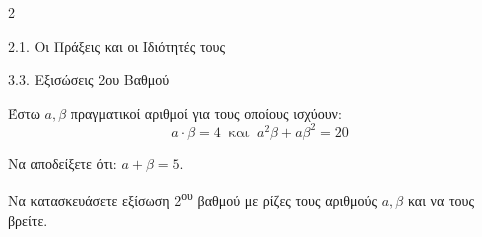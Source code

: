 \begin{ylh}{2}
    \item 2.1. Οι Πράξεις και οι Ιδιότητές τους
    \item 3.3. Εξισώσεις 2ου Βαθμού
\end{ylh}
Έστω $a,\beta$ πραγματικοί αριθμοί για τους οποίους ισχύουν:
\begin{equation*}
a \cdot \beta = 4\ \text{ και }\ a^{2}\beta + a\beta^{2} = 20
\end{equation*}
\begin{alist}
\item Να αποδείξετε ότι: $a + \beta = 5$.
\item Να κατασκευάσετε εξίσωση 2\textsuperscript{ου} βαθμού με ρίζες τους αριθμούς $a,\beta$ και να τους βρείτε.
\end{alist}

